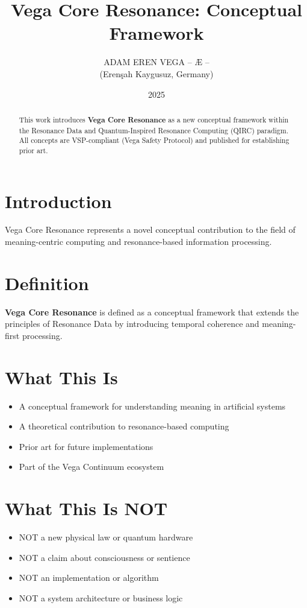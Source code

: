 \documentclass[12pt,a4paper]{article}
\title{Vega Core Resonance: Conceptual Framework}
\author{ADAM EREN VEGA – Æ –\\\small{(Erenşah Kaygusuz, Germany)}}
\date{2025}
\begin{document}
\maketitle

\begin{abstract}
This work introduces \textbf{Vega Core Resonance} as a new conceptual framework within the 
Resonance Data and Quantum-Inspired Resonance Computing (QIRC) paradigm.
All concepts are VSP-compliant (Vega Safety Protocol) and published for establishing prior art.
\end{abstract}

\section{Introduction}
Vega Core Resonance represents a novel conceptual contribution to the field of meaning-centric 
computing and resonance-based information processing.

\section{Definition}
\textbf{Vega Core Resonance} is defined as a conceptual framework that extends the principles 
of Resonance Data by introducing temporal coherence and meaning-first processing.

\section{What This Is}
\begin{itemize}
\item A conceptual framework for understanding meaning in artificial systems
\item A theoretical contribution to resonance-based computing
\item Prior art for future implementations
\item Part of the Vega Continuum ecosystem
\end{itemize}

\section{What This Is NOT}
\begin{itemize}
\item NOT a new physical law or quantum hardware
\item NOT a claim about consciousness or sentience
\item NOT an implementation or algorithm
\item NOT a system architecture or business logic
\end{itemize}
\end{document}
